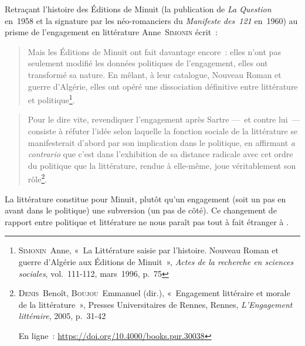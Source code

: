 \documentclass[12pt, a4paper]{article}
\begin{document}
 Retraçant l'histoire des Éditions de Minuit (la publication de \textit{La Question} en~1958 et la signature par les néo-romanciers du \textit{Manifeste des~121} en~1960) au prisme de l'engagement en littérature Anne~\textsc{Simonin} écrit~:
\begin{quote}
    Mais les Éditions de Minuit ont fait davantage encore~: elles n'ont pas seulement modifié les données politiques de l'engagement, elles ont transformé sa nature. En mêlant, à leur catalogue, Nouveau Roman et guerre d'Algérie, elles ont opéré une dissociation définitive entre littérature et politique\footnote{\textsc{Simonin}~Anne, «~La Littérature saisie par l'histoire. Nouveau Roman et guerre d'Algérie aux Éditions de Minuit~»,  \textit{Actes de la recherche en sciences sociales}, vol.~111-112, mars~1996, p.~75}. 
\end{quote}

\begin{quote}
    Pour le dire vite, revendiquer l’engagement après Sartre —~et contre lui~— consiste à réfuter l’idée selon laquelle la fonction sociale de la littérature se manifesterait d’abord par son implication dans le politique, en affirmant \textit{a contrario} que c’est dans l’exhibition de sa distance radicale avec cet ordre du politique que la littérature, rendue à elle-même, joue véritablement son rôle\footnote{\textsc{Denis}~Benoît, \textsc{Boujou}~Emmanuel (dir.), «~Engagement littéraire et morale de la littérature~», Presses Universitaires de Rennes, Rennes, \textit{L'Engagement littéraire}, 2005, p.~31-42
			
			En ligne~: \hyperlink{https://doi.org/10.4000/books.pur.30038}{https://doi.org/10.4000/books.pur.30038}}.
\end{quote}

La littérature constitue pour Minuit, plutôt qu'un engagement (soit un pas en avant dans le politique) une subversion (un pas de côté). Ce changement de rapport entre politique et littérature ne nous paraît pas tout à fait étranger à \punr.
\end{document}

